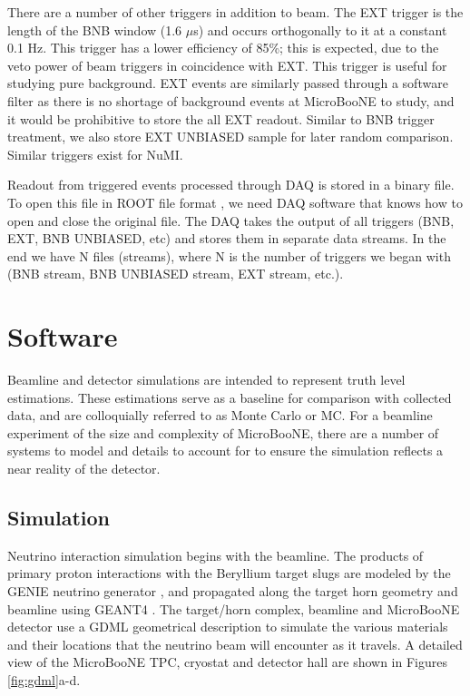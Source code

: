 \documentclass[12pt]{article}
\begin{document}
\par There are a number of other triggers in addition to beam. The EXT trigger is the length of the BNB window (1.6 $\mu$s) and occurs orthogonally to it at a constant 0.1 Hz. This trigger has a lower efficiency of 85\%; this is expected, due to the veto power of beam triggers in coincidence with EXT.  This trigger is useful for studying pure background. EXT events are similarly passed through a software filter as there is no shortage of background events at MicroBooNE to study, and it would be prohibitive to store the all EXT readout. Similar to BNB trigger treatment, we also store EXT UNBIASED sample for later random comparison. Similar triggers exist for NuMI.
\par Readout from triggered events processed through DAQ is stored in a binary file. To open this file in ROOT file format \cite{bib:root}, we need DAQ software that knows how to open and close the original file.  The DAQ takes the output of all triggers (BNB, EXT, BNB UNBIASED, etc) and stores them in separate data streams. In the end we have N files (streams), where N is the number of triggers we began with (BNB stream, BNB UNBIASED stream, EXT stream, etc.). 

\clearpage

\newpage
\section{Software} \label{sec:software}
Beamline and detector simulations are intended to represent truth level estimations. These estimations serve as a baseline for comparison with collected data, and are colloquially referred to as Monte Carlo or MC.  For a beamline experiment of the size and complexity of MicroBooNE, there are a number of systems to model and details to account for to ensure the simulation reflects a near reality of the detector. 

\subsection{Simulation}
Neutrino interaction simulation begins with the beamline.  The products of primary proton interactions with the Beryllium target slugs are modeled by the GENIE neutrino generator \cite{bib:genie}, and propagated along the target horn geometry and beamline using GEANT4 \cite{bib:geant4}.  The target/horn complex, beamline and MicroBooNE detector use a GDML geometrical description \cite{bib:gdml} to simulate the various materials and their locations that the neutrino beam will encounter as it travels. A detailed view of the MicroBooNE TPC, cryostat and detector hall are shown in Figures \ref{fig:gdml}a-d.
\par 
\end{document}

